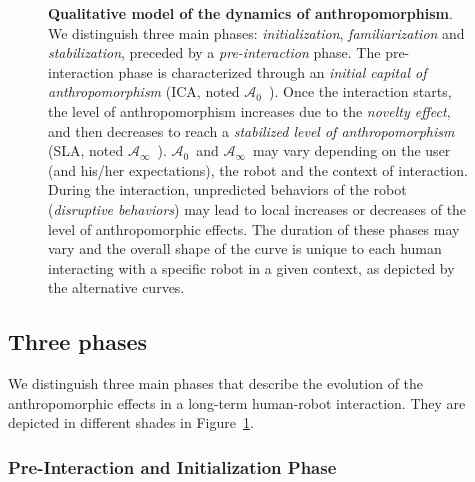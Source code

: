 \documentclass{frontiersSCNS} %
\newcommand{\ICA}{{$\mathcal{A}_0$~}}
\newcommand{\SLA}{{$\mathcal{A}_\infty$~}}
\begin{document}
\begin{figure}[htb]

\caption{\textbf{Qualitative model of the dynamics of anthropomorphism}. We
    distinguish three main phases: \emph{initialization}, \emph{familiarization}
    and \emph{stabilization}, preceded by a \emph{pre-interaction} phase. The
    pre-interaction phase is characterized through an \emph{initial capital of
    anthropomorphism} (ICA, noted \ICA).  Once the interaction starts, the level
    of anthropomorphism increases due to the \emph{novelty effect}, and then
    decreases to reach a \emph{stabilized level of anthropomorphism} (SLA, noted
    \SLA). \ICA and \SLA may vary depending on the user (and his/her
    expectations), the robot and the context of interaction.  During the
    interaction, unpredicted behaviors of the robot (\emph{disruptive
    behaviors}) may lead to local increases or decreases of the level of
    anthropomorphic effects. The duration of these phases may vary and the
    overall shape of the curve is unique to each human interacting with a
    specific robot in a given context, as depicted by the alternative curves.}

\label{fig:dynamics}
\end{figure}

\subsection{Three phases}
\label{sec:phases}

We distinguish three main phases that describe the evolution of the
anthropomorphic effects in a long-term human-robot interaction. They are
depicted in different shades in Figure~\ref{fig:dynamics}.

\subsubsection{Pre-Interaction and Initialization Phase\\}
\end{document}
